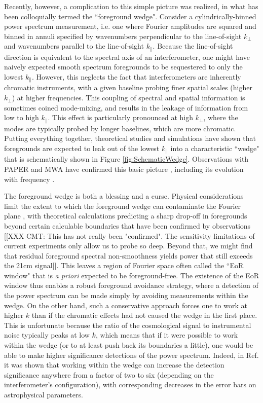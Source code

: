 \documentclass[twocolumn,aps,prd,nofootinbib,showpacs]{revtex4-1}
\begin{document}
Recently, however, a complication to this simple picture was realized, in what has been colloquially termed the ``foreground wedge".  Consider a cylindrically-binned power spectrum measurement, i.e. one where Fourier amplitudes are squared and binned in annuli specified by wavenumbers perpendicular to the line-of-sight $k_\perp$ and wavenumbers parallel to the line-of-sight $k_\parallel$.  Because the line-of-sight direction is equivalent to the spectral axis of an interferometer, one might have naively expected smooth spectrum foregrounds to be sequestered to only the lowest $k_\parallel$.  However, this neglects the fact that interferometers are inherently chromatic instruments, with a given baseline probing finer spatial scales (higher $k_\perp$) at higher frequencies.  This coupling of spectral and spatial information is sometimes coined mode-mixing, and results in  the leakage of information from low to high $k_\parallel$.  This effect is particularly pronounced at high $k_\perp$, where the modes are typically probed by longer baselines, which are more chromatic.  Putting everything together, theoretical studies and simulations \cite{Datta2010,Vedantham2012,Morales2012,Parsons2012b,Trott2012,Thyagarajan2013,Hazelton2013} have shown that foregrounds are expected to leak out of the lowest $k_\parallel$ into a characteristic ``wedge" that is schematically shown in Figure \ref{fig:SchematicWedge}.  Observations with PAPER and MWA have confirmed this basic picture \cite{Pober2013}, including its evolution with frequency \cite{Dillon2014}.

The foreground wedge is both a blessing and a curse.  Physical considerations limit the extent to which the foreground wedge can contaminate the Fourier plane \cite{Parsons2012b}, with theoretical calculations predicting a sharp drop-off in foregrounds beyond certain calculable boundaries that have been confirmed by observations \cite{Pober2013} [[XXX CMT: This has not really been "confirmed". The sensitivity limitations of current experiments only allow us to probe so deep. Beyond that, we might find that residual foreground spectral non-smoothness yields power that still exceeds the 21cm signal]].  This leaves a region of Fourier space often called the ``EoR window" that is \emph{a priori} expected to be foreground-free.  The existence of the EoR window thus enables a robust foreground avoidance strategy, where a detection of the power spectrum can be made simply by avoiding measurements within the wedge.  On the other hand, such a conservative approach forces one to work at higher $k$ than if the chromatic effects had not caused the wedge in the first place.  This is unfortunate because the ratio of the cosmological signal to instrumental noise typically peaks at low $k$, which means that if it were possible to work within the wedge (or to at least push back its boundaries a little), one would be able to make higher significance detections of the power spectrum.  Indeed, in Ref. \cite{Pober2014} it was shown that working within the wedge can increase the detection significance anywhere from a factor of two to six (depending on the interferometer's configuration), with corresponding decreases in the error bars on astrophysical parameters.
\end{document}
